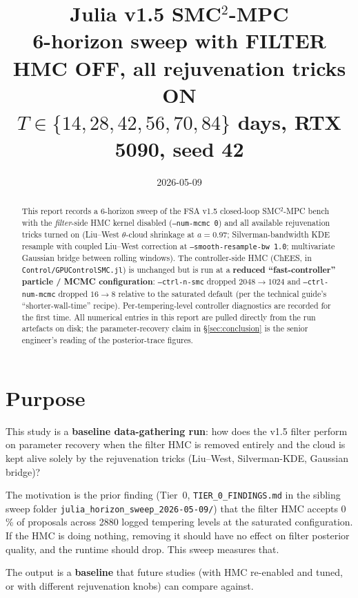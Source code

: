 \documentclass[11pt,a4paper]{article}
\title{Julia v1.5 SMC$^2$-MPC \\
       6-horizon sweep with FILTER HMC OFF, all rejuvenation tricks ON \\
       \large $T \in \{14, 28, 42, 56, 70, 84\}$ days, RTX 5090, seed 42}
\author{}
\date{2026-05-09}
\begin{document}
\maketitle

\begin{abstract}
This report records a 6-horizon sweep of the FSA v1.5 closed-loop
SMC$^2$-MPC bench with the \emph{filter}-side HMC kernel disabled
(\texttt{--num-mcmc 0}) and all available rejuvenation tricks turned
on (Liu--West $\theta$-cloud shrinkage at $a=0.97$;
Silverman-bandwidth KDE resample with coupled Liu--West correction
at \texttt{--smooth-resample-bw 1.0}; multivariate Gaussian bridge
between rolling windows). The controller-side HMC (ChEES, in
\texttt{Control/GPUControlSMC.jl}) is unchanged but is run at a
\textbf{reduced ``fast-controller'' particle / MCMC configuration}:
\texttt{--ctrl-n-smc} dropped $2048 \to 1024$ and
\texttt{--ctrl-num-mcmc} dropped $16 \to 8$ relative to the
saturated default (per the technical guide's
``shorter-wall-time'' recipe). Per-tempering-level controller
diagnostics are recorded for the first time. All numerical entries
in this report are pulled directly from the run artefacts on disk;
the parameter-recovery claim in \S\ref{sec:conclusion} is the senior
engineer's reading of the posterior-trace figures.
\end{abstract}

\tableofcontents
\clearpage


\section{Purpose}
\label{sec:purpose}

This study is a \textbf{baseline data-gathering run}: how does the
v1.5 filter perform on parameter recovery when the filter HMC is
removed entirely and the cloud is kept alive solely by the
rejuvenation tricks (Liu--West, Silverman-KDE, Gaussian bridge)?

The motivation is the prior finding (Tier~0,
\texttt{TIER\_0\_FINDINGS.md} in the sibling sweep folder
\texttt{julia\_horizon\_sweep\_2026-05-09/}) that the filter HMC
accepts 0\,\% of proposals across 2880 logged tempering levels at the
saturated configuration. If the HMC is doing nothing, removing it
should have no effect on filter posterior quality, and the runtime
should drop. This sweep measures that.

The output is a \textbf{baseline} that future studies (with HMC
re-enabled and tuned, or with different rejuvenation knobs) can
compare against.
\end{document}
